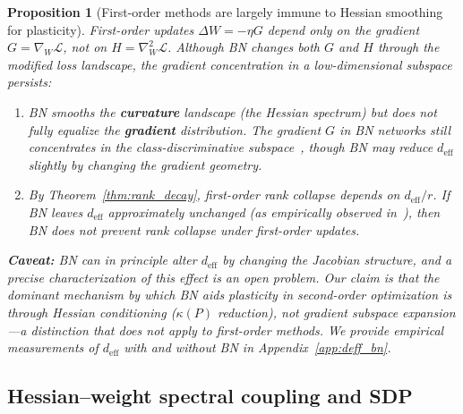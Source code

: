 \documentclass{article}
\newtheorem{proposition}[theorem]{Proposition}
\newcommand{\cL}{\mathcal{L}}
\begin{document}
\begin{proposition}[First-order methods are largely immune to Hessian smoothing for plasticity]
\label{prop:first_order_immune}
First-order updates $\Delta W = -\eta G$ depend only on the gradient $G = \nabla_W \cL$, not on $H = \nabla^2_W \cL$. Although BN changes both $G$ and $H$ through the modified loss landscape, the \emph{gradient concentration} in a low-dimensional subspace persists:
\begin{enumerate}[nosep]
    \item BN smooths the \textbf{curvature} landscape (the Hessian spectrum) but does not fully equalize the \textbf{gradient} distribution. The gradient $G$ in BN networks still concentrates in the class-discriminative subspace~\citep{ben2022high}, though BN may reduce $d_\mathrm{eff}$ slightly by changing the gradient geometry.
    \item By Theorem~\ref{thm:rank_decay}, first-order rank collapse depends on $d_{\mathrm{eff}} / r$. If BN leaves $d_\mathrm{eff}$ approximately unchanged (as empirically observed in~\citet{ghorbani2019investigation}), then BN does not prevent rank collapse under first-order updates.
\end{enumerate}
\textbf{Caveat:} BN can in principle alter $d_\mathrm{eff}$ by changing the Jacobian structure, and a precise characterization of this effect is an open problem. Our claim is that the dominant mechanism by which BN aids plasticity in second-order optimization is through Hessian conditioning ($\kappa(P)$ reduction), not gradient subspace expansion---a distinction that does not apply to first-order methods. We provide empirical measurements of $d_\mathrm{eff}$ with and without BN in Appendix~\ref{app:deff_bn}.
\end{proposition}

\subsection{Hessian--weight spectral coupling and SDP}
\end{document}
